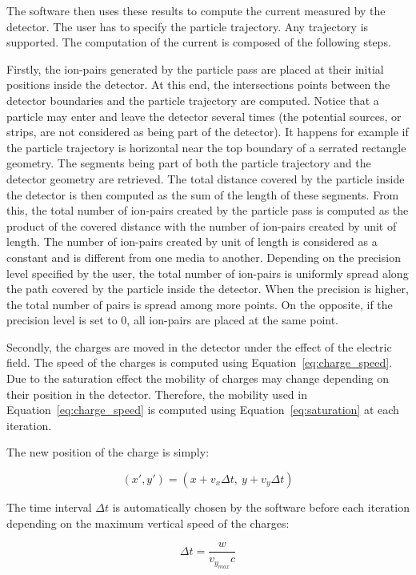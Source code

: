 \documentclass[11pt]{article}
\begin{document}
	The software then uses these results to compute the current measured by the
	detector. The user has to specify the particle trajectory. Any trajectory is
	supported. The computation of the current is composed of the following steps.

	Firstly, the ion-pairs generated by the particle pass are placed at their initial
	positions inside the detector. At this end, the intersections points between the
	detector boundaries and the particle
	trajectory are computed. Notice that a particle may enter and leave the detector
	several times (the potential sources, or strips, are not considered as being
	part of the detector). It happens for example if the particle trajectory is
	horizontal near the top boundary of a serrated rectangle geometry.
	The segments being part of both the particle trajectory and the detector
	geometry are retrieved. The total
	distance covered by the particle inside the detector is then computed as
	the sum of the length of these segments. From this, the total number of ion-pairs
	created by the particle pass is computed
	as the product of the covered distance with the number of ion-pairs created by unit
	of length. The number of ion-pairs created by unit
	of length is considered as a constant and is different from one
	media to another. Depending on the precision level specified by the user, the
	total number of ion-pairs
	is uniformly spread along the path covered by the particle inside the
	detector. When the precision is higher, the total number of pairs is spread
	among more points. On the opposite, if the precision level is set to 0,
	all ion-pairs are placed at the same point.


	Secondly, the charges are moved in the detector under the effect of the electric
	field. The speed of the charges is computed using Equation~\ref{eq:charge_speed}.
	Due to the saturation effect the mobility of charges may change depending on
	their position in the detector. Therefore, the mobility used in Equation~\ref{eq:charge_speed}
	is computed using Equation~\ref{eq:saturation} at each iteration.



	The new position of the charge is simply:

	\[(x',y') = (x + v_x \Delta t, \ y + v_y \Delta t)\]

	The time interval $\Delta t$ is automatically chosen by the software before
	each iteration depending on the maximum vertical speed of the charges:

	\[\Delta t = \frac{w}{v_{y_{max}} c}\]
\end{document}
